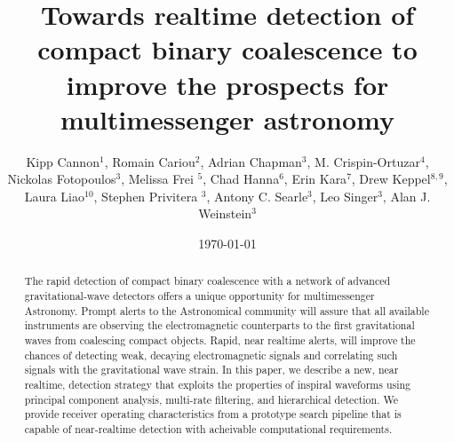\documentclass[showpacs,groupedaddress,showkeys,preprintnumbers]{iopart}
\begin{document}
\title[LLOID]{Towards realtime detection of compact binary coalescence to
improve the prospects for multimessenger astronomy}

\date{\today}

\author{Kipp Cannon$^{1}$, Romain Cariou$^{2}$, Adrian Chapman$^3$, M.
Crispin-Ortuzar$^4$, Nickolas Fotopoulos$^3$, Melissa Frei $^5$, Chad
Hanna$^{6}$, Erin Kara$^{7}$, Drew Keppel$^{8,9}$, Laura Liao$^{10}$, Stephen
Privitera $^3$, Antony C.  Searle$^3$, Leo Singer$^3$, Alan J.  Weinstein$^3$}

\address{$^1$ Canadian Institute for Theoretical Astrophysics, Toronto, ON,
Canada}
\address{$^2$  Département de physique, École Normale Supérieure de Cachan, 61
Avenue du Président Wilson, 94235 Cachan Cedex, France}
\address{$^3$ LIGO Laboratory - California Institute of Technology, Pasadena,
CA, USA} 
\address{$^4$ Facultat de Física, Universitat de València, E-46100 Burjassot,
Spain} 
\address{$^5$ The University of Texas at Austin, Austin, TX, USA}
\address{$^6$ Perimeter Institute for Theoretical Physics, Waterloo, ON,
Canada} 
\address{$^7$ Department of Physics and Astronomy, Barnard College, Columbia
University, New York, NY 10027, USA} 
\address{$^8$ Albert-Einstein-Institut, Max-Planck-Institut f\"{u}r
Gravitationphysik, Hannover, Germany} 
\address{$^9$ Leibniz Universit\"{a}t Hannover, Hannover, Germany}
\address{$^{10}$ Ryerson University, Toronto, ON, Canada}

\begin{abstract}
The rapid detection of compact binary coalescence with a network of advanced
gravitational-wave detectors offers a unique opportunity for multimessenger
Astronomy.  Prompt alerts to the Astronomical community will assure that all
available instruments are observing the electromagnetic counterparts to the
first gravitational waves from coalescing compact objects.   Rapid, near
realtime alerts, will improve the chances of detecting weak, decaying
electromagnetic signals and correlating such signals with the gravitational
wave strain.  In this paper, we describe a new, near realtime, detection
strategy that exploits the properties of inspiral waveforms using principal
component analysis, multi-rate filtering, and hierarchical detection.  We
provide receiver operating characteristics from a prototype search pipeline
that is capable of near-realtime detection with acheivable computational
requirements.  
\end{abstract}
\end{document}
